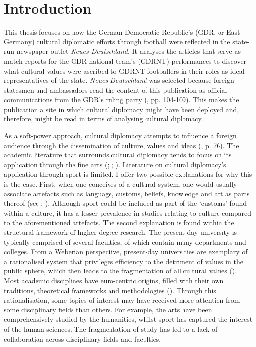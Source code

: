 \chapter{Introduction}\label{cha:introduction}

This thesis focuses on how the German Democratic Republic’s (GDR, or East Germany) cultural diplomatic efforts through football were reflected in the state-run newspaper outlet \textit{Neues Deutschland}. It analyses the articles that serve as match reports for the GDR national team's (GDRNT) performances to discover what cultural values were ascribed to GDRNT footballers in their roles as ideal representatives of the state. \textit{Neues Deutschland} was selected because foreign statesmen and ambassadors read the content of this publication as official communications from the GDR’s ruling party (\cite{fiedler2014}, pp. 104-109). This makes the publication a site in which cultural diplomacy might have been deployed and, therefore, might be read in terms of analysing cultural diplomacy.

As a soft-power approach, cultural diplomacy attempts to influence a foreign audience through the dissemination of culture, values and ideas (\cite{lenczowski2009}, p. 76). The academic literature that surrounds cultural diplomacy tends to focus on its application through the fine arts (\cite{prevots1998}; \cite{david-fox2011}; \cite{mikkonensuutari2016}). Literature on cultural diplomacy’s application through sport is limited. I offer two possible explanations for why this is the case. First, when one conceives of a cultural system, one would usually associate artefacts such as language, customs, beliefs, knowledge and art as parts thereof (see \cite{boas1930}; \cite{tylor1958}). Although sport could be included as part of the ‘customs’ found within a culture, it has a lesser prevalence in studies relating to culture compared to the aforementioned artefacts. The second explanation is found within the structural framework of higher degree research. The present-day university is typically comprised of several faculties, of which contain many departments and colleges. From a Weberian perspective, present-day universities are exemplary of a rationalised system that privileges efficiency to the detriment of values in the public sphere, which then leads to the fragmentation of all cultural values (\cite{weber1976}). Most academic disciplines have euro-centric origins, filled with their own traditions, theoretical frameworks and methodologies (\cite{klein1990}). Through this rationalisation, some topics of interest may have received more attention from some disciplinary fields than others. For example, the arts have been comprehensively studied by the humanities, whilst sport has captured the interest of the human sciences. The fragmentation of study has led to a lack of collaboration across disciplinary fields and faculties.

